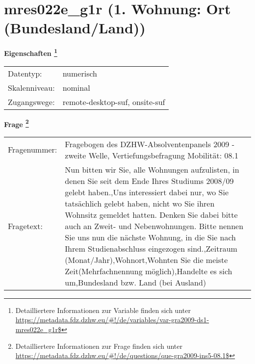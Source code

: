 
    \setcounter{footnote}{0}

    \vspace*{-1.8cm}
	\section{mres022e\_g1r (1. Wohnung: Ort (Bundesland/Land))}
	\label{section:mres022e_g1r}



    \vspace*{0.5cm}
    \noindent\textbf{Eigenschaften
	\footnote{Detailliertere Informationen zur Variable finden sich unter
		\url{https://metadata.fdz.dzhw.eu/\#!/de/variables/var-gra2009-ds1-mres022e_g1r$}}}\\
	\begin{tabularx}{\hsize}{@{}lX}
	Datentyp: & numerisch \\
	Skalenniveau: & nominal \\
	Zugangswege: &
	  remote-desktop-suf, 
	  onsite-suf
 \\
    \end{tabularx}



				\vspace*{0.5cm}
                \noindent\textbf{Frage
	                \footnote{Detailliertere Informationen zur Frage finden sich unter
		              \url{https://metadata.fdz.dzhw.eu/\#!/de/questions/que-gra2009-ins5-08.1$}}}\\
				\begin{tabularx}{\hsize}{@{}lX}
					Fragenummer: &
					  Fragebogen des DZHW-Absolventenpanels 2009 - zweite Welle, Vertiefungsbefragung Mobilität:
					  08.1
 \\
					Fragetext: & Nun bitten wir Sie, alle Wohnungen aufzulisten, in denen Sie seit dem Ende Ihres Studiums 2008/09 gelebt haben.,Uns interessiert dabei nur, wo Sie tatsächlich gelebt haben, nicht wo Sie ihren Wohnsitz gemeldet hatten. Denken Sie dabei bitte auch an Zweit- und Nebenwohnungen. Bitte nennen Sie uns nun die nächste Wohnung, in die Sie nach Ihrem Studienabschluss eingezogen sind.,Zeitraum (Monat/Jahr),Wohnort,Wohnten Sie die meiste Zeit(Mehrfachnennung möglich),Handelte es sich um,Bundesland bzw. Land (bei Ausland) \\
				\end{tabularx}






